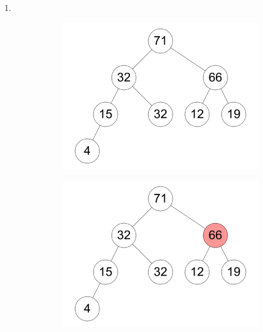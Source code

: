 \documentclass[11pt,a4paper]{article}
\begin{document}
\begin{loesung}
\begin{enumerate}
        \item \ \\
        \begin{figure}[h!]
            \centering
            \begin{subfigure}[b]{0.23\textwidth}
                \centering
                \includegraphics[width=\textwidth]{img/d1}
            \end{subfigure}
            \begin{subfigure}[b]{0.23\textwidth}
                \centering
                \includegraphics[width=\textwidth]{img/d2}
            \end{subfigure}
            \begin{subfigure}[b]{0.23\textwidth}

\end{subfigure}
\end{figure}
\end{enumerate}
\end{loesung}
\end{document}
